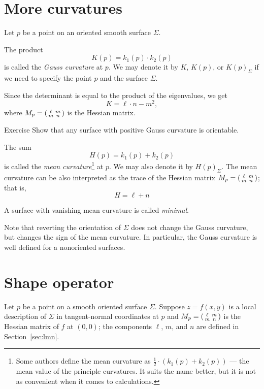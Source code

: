 \section{More curvatures}\label{sec:More curvatures}

Let $p$ be a point on an oriented smooth surface $\Sigma$.

The product 
\[K(p)=k_1(p)\cdot k_2(p)\]
is called the \emph{Gauss curvature} at $p$.
We may denote it by $K$, $K(p)$, or $K(p)_\Sigma$ if we need to specify the point $p$ and the surface $\Sigma$.

Since the determinant is equal to the product of the eigenvalues, we get
\[K=\ell\cdot n-m^2,\]
where 
$M_p\z=
(\begin{smallmatrix}
\ell&m
\\
m&n
\end{smallmatrix}
)
$ is the Hessian matrix.

\begin{thm}{Exercise}\label{ex:gauss+orientable}
Show that any surface with positive Gauss curvature is orientable. 
\end{thm}

The sum 
\[H(p)=k_1(p)+ k_2(p)\] 
is called the \emph{mean curvature}\footnote{Some authors define the mean curvature as $\tfrac12\cdot(k_1(p)+ k_2(p))$ --- the mean value of the principle curvatures. It suits the name better, but it is not as convenient when it comes to calculations.} at $p$.
We may also denote it by $H(p)_\Sigma$.
The mean curvature can be also interpreted as the trace of the Hessian matrix $M_p\z=
(\begin{smallmatrix}
\ell&m
\\
m&n
\end{smallmatrix}
)$;
that is,
\[H=\ell+n\] 

A surface with vanishing mean curvature is called \emph{minimal}.

Note that reverting the orientation of $\Sigma$ does not change the Gauss curvature, but changes the sign of the mean curvature.
In particular, the Gauss curvature is well defined  for a nonoriented surfaces.




\section{Shape operator}

Let $p$ be a point on a smooth oriented surface $\Sigma$.
Suppose $z=f(x,y)$ is a local description of $\Sigma$ in tangent-normal coordinates at $p$
and $M_p\z=
(\begin{smallmatrix}
\ell&m
\\
m&n
\end{smallmatrix}
)
$
is the Hessian matrix of $f$ at $(0,0)$; the components $\ell$, $m$, and $n$ are defined in Section~\ref{sec:lmn}.

